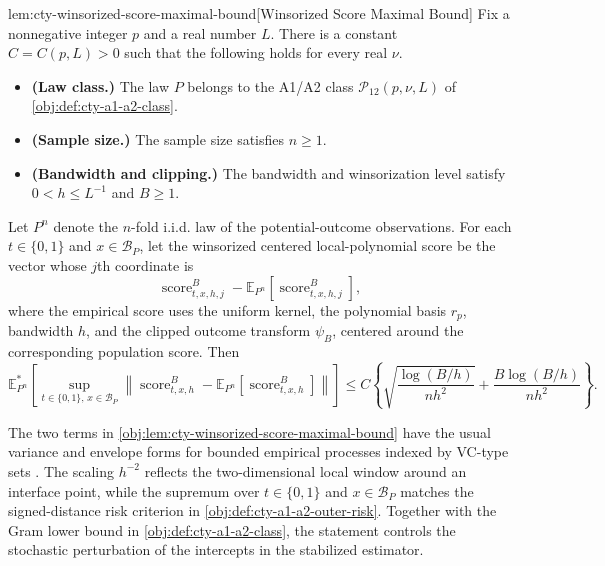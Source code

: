 \begin{lemmav}{lem:cty-winsorized-score-maximal-bound}[Winsorized Score Maximal Bound]
Fix a nonnegative integer \(p\) and a real number \(L\).  There is a constant
\(C=C(p,L)>0\) such that the following holds for every real \(\nu\).

\begin{itemize}
\item \textbf{(Law class.)} The law \(P\) belongs to the A1/A2 class
\(\mathcal P_{12}(p,\nu,L)\) of \cref{obj:def:cty-a1-a2-class}.
\item \textbf{(Sample size.)} The sample size satisfies \(n\geq 1\).
\item \textbf{(Bandwidth and clipping.)} The bandwidth and winsorization level satisfy
\(0<h\leq L^{-1}\) and \(B\geq 1\).
\end{itemize}

Let \(P^n\) denote the \(n\)-fold i.i.d. law of the potential-outcome observations.
For each \(t\in\{0,1\}\) and \(x\in\mathcal B_P\), let the winsorized centered local-polynomial
score be the vector whose \(j\)th coordinate is
\[
\operatorname{score}^{B}_{t,x,h,j}
  - \mathbb E_{P^n}\!\left[\operatorname{score}^{B}_{t,x,h,j}\right],
\]
where the empirical score uses the uniform kernel, the polynomial basis \(r_p\), bandwidth \(h\),
and the clipped outcome transform \(\psi_B\), centered around the corresponding population score.
Then
\[
\mathbb E_{P^n}^{*}\!\left[
\sup_{t\in\{0,1\},\,x\in\mathcal B_P}
\left\|
\operatorname{score}^{B}_{t,x,h}
-\mathbb E_{P^n}\!\left[\operatorname{score}^{B}_{t,x,h}\right]
\right\|
\right]
\leq
C\left\{
\sqrt{\frac{\log(B/h)}{n h^2}}
+
\frac{B\log(B/h)}{n h^2}
\right\}.
\]
\end{lemmav}

The two terms in \cref{obj:lem:cty-winsorized-score-maximal-bound} have the usual variance and envelope forms for bounded empirical processes indexed by VC-type sets \citep{Pollard1984,VanderVaart1996}. The scaling \(h^{-2}\) reflects the two-dimensional local window around an interface point, while the supremum over \(t\in\{0,1\}\) and \(x\in\mathcal B_P\) matches the signed-distance risk criterion in \cref{obj:def:cty-a1-a2-outer-risk}. Together with the Gram lower bound in \cref{obj:def:cty-a1-a2-class}, the statement controls the stochastic perturbation of the intercepts in the stabilized estimator.

